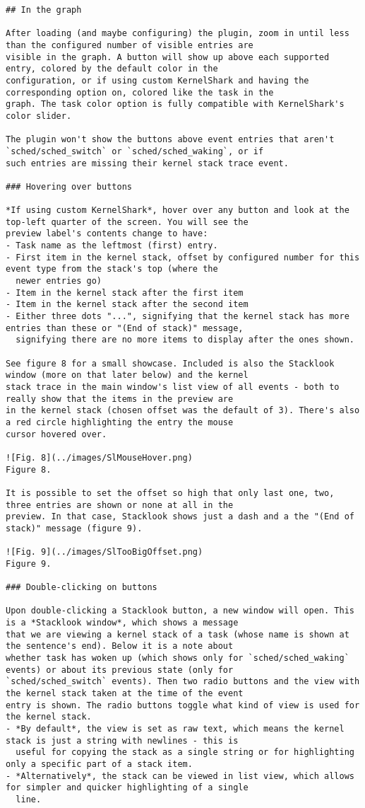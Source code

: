 \begin{verbatim}
## In the graph

After loading (and maybe configuring) the plugin, zoom in until less than the configured number of visible entries are 
visible in the graph. A button will show up above each supported entry, colored by the default color in the 
configuration, or if using custom KernelShark and having the corresponding option on, colored like the task in the 
graph. The task color option is fully compatible with KernelShark's color slider.

The plugin won't show the buttons above event entries that aren't `sched/sched_switch` or `sched/sched_waking`, or if
such entries are missing their kernel stack trace event.

### Hovering over buttons

*If using custom KernelShark*, hover over any button and look at the top-left quarter of the screen. You will see the
preview label's contents change to have:
- Task name as the leftmost (first) entry.
- First item in the kernel stack, offset by configured number for this event type from the stack's top (where the
  newer entries go)
- Item in the kernel stack after the first item
- Item in the kernel stack after the second item
- Either three dots "...", signifying that the kernel stack has more entries than these or "(End of stack)" message,
  signifying there are no more items to display after the ones shown.

See figure 8 for a small showcase. Included is also the Stacklook window (more on that later below) and the kernel
stack trace in the main window's list view of all events - both to really show that the items in the preview are 
in the kernel stack (chosen offset was the default of 3). There's also a red circle highlighting the entry the mouse
cursor hovered over. 

![Fig. 8](../images/SlMouseHover.png)
Figure 8.

It is possible to set the offset so high that only last one, two, three entries are shown or none at all in the 
preview. In that case, Stacklook shows just a dash and a the "(End of stack)" message (figure 9). 

![Fig. 9](../images/SlTooBigOffset.png)
Figure 9.

### Double-clicking on buttons

Upon double-clicking a Stacklook button, a new window will open. This is a *Stacklook window*, which shows a message
that we are viewing a kernel stack of a task (whose name is shown at the sentence's end). Below it is a note about
whether task has woken up (which shows only for `sched/sched_waking` events) or about its previous state (only for
`sched/sched_switch` events). Then two radio buttons and the view with the kernel stack taken at the time of the event 
entry is shown. The radio buttons toggle what kind of view is used for the kernel stack.
- *By default*, the view is set as raw text, which means the kernel stack is just a string with newlines - this is 
  useful for copying the stack as a single string or for highlighting only a specific part of a stack item.
- *Alternatively*, the stack can be viewed in list view, which allows for simpler and quicker highlighting of a single 
  line.


\end{verbatim}
